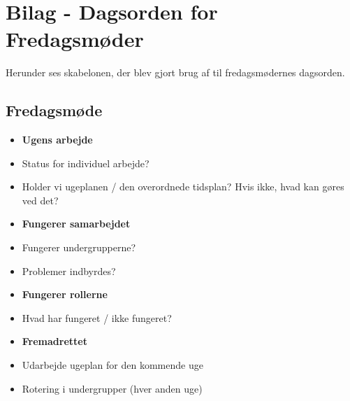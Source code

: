 \chapter{Bilag - Dagsorden for Fredagsmøder} \label{Bilag3}
Herunder ses skabelonen, der blev gjort brug af til fredagsmødernes dagsorden.
  
\section{Fredagsmøde}
\begin{itemize}
\item \textbf{Ugens arbejde}
\indent \item Status for individuel arbejde?
\indent \item Holder vi ugeplanen / den overordnede tidsplan? Hvis ikke, hvad kan gøres ved det?
\item \textbf{Fungerer samarbejdet}
\indent \item Fungerer undergrupperne?
\indent \item Problemer indbyrdes?
\item \textbf{Fungerer rollerne}
\indent \item Hvad har fungeret / ikke fungeret?
\item \textbf{Fremadrettet}
\indent \item Udarbejde ugeplan for den kommende uge 
\indent \item Rotering i undergrupper (hver anden uge)
\end{itemize}